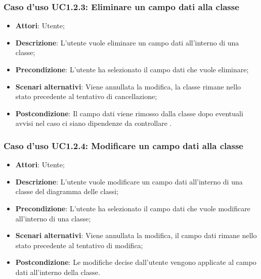 \documentclass[a4paper]{report}
\begin{document}
\subsubsection{Caso d'uso UC1.2.3: Eliminare un campo dati alla classe}
\begin{itemize}
	\item \textbf{Attori}: Utente;
	
	\item \textbf{Descrizione}: L'utente vuole eliminare un campo dati all'interno di una classe;
	
	\item \textbf{Precondizione}: L'utente ha selezionato il campo dati che vuole eliminare;
	
	\item \textbf{Scenari alternativi}: Viene annullata la modifica, la classe
	rimane nello stato precedente al tentativo di cancellazione;
	
	
	\item \textbf{Postcondizione}: Il campo dati viene rimosso dalla classe dopo eventuali avvisi nel caso ci siano dipendenze da controllare .
\end{itemize}

\subsubsection{Caso d'uso UC1.2.4: Modificare un campo dati alla classe}
\begin{itemize}
	\item \textbf{Attori}: Utente;
	
	\item \textbf{Descrizione}: L'utente vuole modificare un campo dati all'interno di una classe del diagramma delle classi;
	
	\item \textbf{Precondizione}: L'utente ha selezionato il campo dati che vuole modificare all'interno di una classe;
	
	\item \textbf{Scenari alternativi}: Viene annullata la modifica, il campo dati
	rimane nello stato precedente al tentativo di modifica;
	
	\item \textbf{Postcondizione}: Le modifiche decise dall'utente vengono applicate al campo dati all'interno della classe.
\end{itemize}
\end{document}
